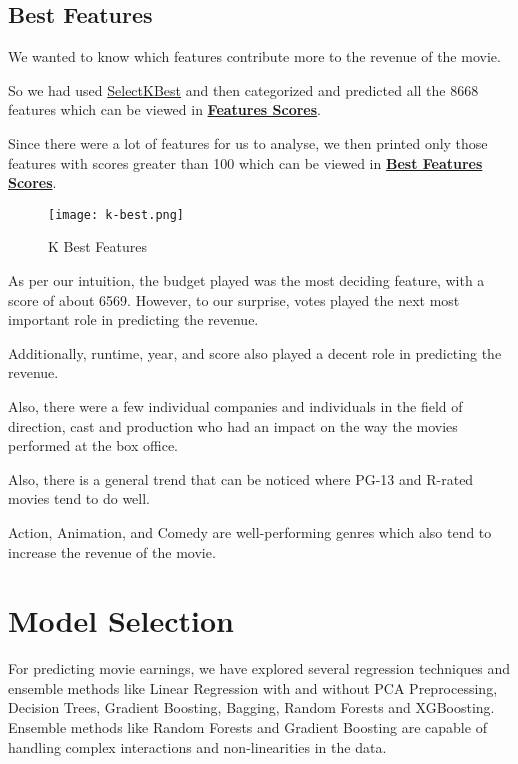 \documentclass[conference]{IEEEtran}
\begin{document}
        \subsection*{Best Features}
            We wanted to know which features contribute more to the revenue of the movie.

            So we had used \href{https://scikit-learn.org/stable/modules/generated/sklearn.feature_selection.SelectKBest.html}{SelectKBest} and then categorized and predicted all the 8668 features which can be viewed in \href{https://github.com/Vikranth3140/Movie-Revenue-Prediction/blob/main/Helper%20files/Best%20Festures/feature_scores.txt}{\textbf{Features Scores}}.

            Since there were a lot of features for us to analyse, we then printed only those features with scores greater than 100 which can be viewed in \href{https://github.com/Vikranth3140/Movie-Revenue-Prediction/blob/main/Helper%20files/Best%20Festures/significant_features.txt}{\textbf{Best Features Scores}}.

            \begin{figure}
                \centering
                \texttt{[image: k-best.png]}
                \caption{K Best Features}
                \label{fig:k-best}
            \end{figure}

            As per our intuition, the budget played was the most deciding feature, with a score of about 6569.
            However, to our surprise, votes played the next most important role in predicting the revenue.

            Additionally, runtime, year, and score also played a decent role in predicting the revenue.

            Also, there were a few individual companies and individuals in the field of direction, cast and production who had an impact on the way the movies performed at the box office.

            Also, there is a general trend that can be noticed where PG-13 and R-rated movies tend to do well.

            Action, Animation, and Comedy are well-performing genres which also tend to increase the revenue of the movie.

\section{Model Selection}
    For predicting movie earnings, we have explored several regression techniques and ensemble methods like Linear Regression with and without PCA Preprocessing, Decision Trees, Gradient Boosting, Bagging, Random Forests and XGBoosting.
    Ensemble methods like Random Forests and Gradient Boosting are capable of handling complex interactions and non-linearities in the data.
\end{document}
